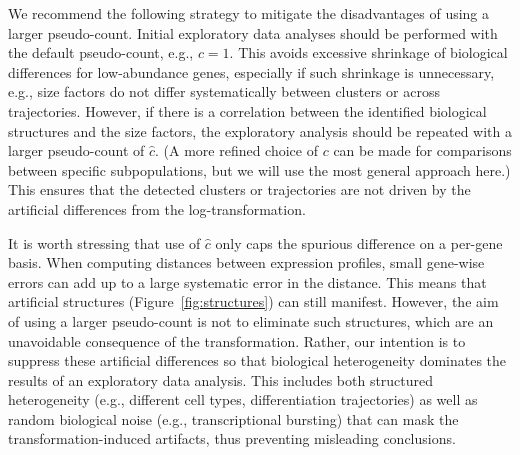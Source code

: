 \documentclass[10pt,letterpaper]{article}
\begin{document}
We recommend the following strategy to mitigate the disadvantages of using a larger pseudo-count.
Initial exploratory data analyses should be performed with the default pseudo-count, e.g., $c=1$.
This avoids excessive shrinkage of biological differences for low-abundance genes, especially if such shrinkage is unnecessary, 
e.g., size factors do not differ systematically between clusters or across trajectories.
However, if there is a correlation between the identified biological structures and the size factors, the exploratory analysis should be repeated with a larger pseudo-count of $\hat c$. 
(A more refined choice of $c$ can be made for comparisons between specific subpopulations, but we will use the most general approach here.)
This ensures that the detected clusters or trajectories are not driven by the artificial differences from the log-transformation.

It is worth stressing that use of $\hat c$ only caps the spurious difference on a per-gene basis.
When computing distances between expression profiles, small gene-wise errors can add up to a large systematic error in the distance.
This means that artificial structures (Figure~\ref{fig:structures}) can still manifest.
However, the aim of using a larger pseudo-count is not to eliminate such structures, which are an unavoidable consequence of the transformation.
Rather, our intention is to suppress these artificial differences so that biological heterogeneity dominates the results of an exploratory data analysis.
This includes both structured heterogeneity (e.g., different cell types, differentiation trajectories) as well as random biological noise (e.g., transcriptional bursting) that can mask the transformation-induced artifacts, thus preventing misleading conclusions.



\end{document}
